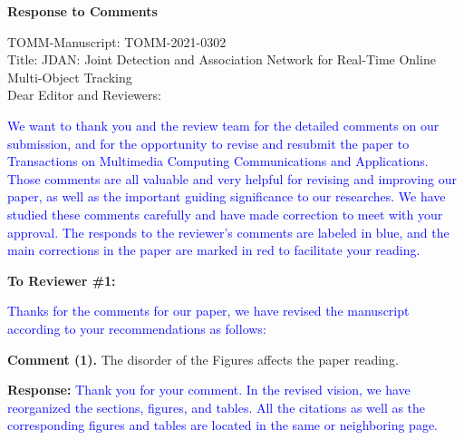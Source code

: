 \documentclass[12pt,journal,onecolumn]{IEEEtran}
\begin{document}
\begin{center}
	\textbf{\LARGE Response to Comments} 
\end{center}
\vspace{8pt} 

\noindent TOMM-Manuscript: TOMM-2021-0302 \\

\noindent Title: JDAN: Joint Detection and Association Network for Real-Time Online Multi-Object Tracking \\

\noindent Dear Editor and Reviewers:

\textcolor{blue}{
We want to thank you and the review team for the detailed comments on our submission, and for the opportunity to revise and resubmit the paper to Transactions on Multimedia Computing Communications and Applications.  
Those comments are all valuable and very helpful for revising and improving our paper, as well as the important guiding significance to our researches. 
We have studied these comments carefully and have made correction to meet with your approval. 
The responds to the reviewer's comments are labeled in blue, 
and the main corrections in the paper are marked in red to facilitate your reading.
}

\vspace{8pt} 

\newpage





\textbf{To Reviewer \#1:}

\textcolor{blue}{Thanks for the comments for our paper, we have revised the manuscript according to your recommendations as follows:}

\textbf{Comment (1).} The disorder of the Figures affects the paper reading.

\textbf{Response:} \textcolor{blue}{Thank you for your comment.
In the revised vision, we have reorganized the sections, figures, and tables.
All the citations as well as the corresponding figures and tables are located in the same or neighboring page.
} \\ 
\end{document}
